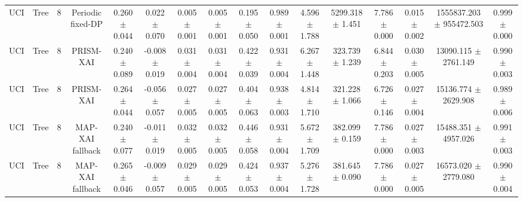 \begin{tabular}{lccccccccccccccc}
UCI & Tree & 8 & Periodic fixed-DP & 0.260 $\pm$ 0.044 & 0.022 $\pm$ 0.070 & 0.005 $\pm$ 0.001 & 0.005 $\pm$ 0.001 & 0.195 $\pm$ 0.050 & 0.989 $\pm$ 0.001 & 4.596 $\pm$ 1.788 & 5299.318 $\pm$ 1.451 & 7.786 $\pm$ 0.000 & 0.015 $\pm$ 0.002 & 1555837.203 $\pm$ 955472.503 & 0.999 $\pm$ 0.000 \\
UCI & Tree & 8 & PRISM-XAI & 0.240 $\pm$ 0.089 & -0.008 $\pm$ 0.019 & 0.031 $\pm$ 0.004 & 0.031 $\pm$ 0.004 & 0.422 $\pm$ 0.039 & 0.931 $\pm$ 0.004 & 6.267 $\pm$ 1.448 & 323.739 $\pm$ 1.239 & 6.844 $\pm$ 0.203 & 0.030 $\pm$ 0.005 & 13090.115 $\pm$ 2761.149 & 0.990 $\pm$ 0.003 \\
UCI & Tree & 8 & PRISM-XAI & 0.264 $\pm$ 0.044 & -0.056 $\pm$ 0.057 & 0.027 $\pm$ 0.005 & 0.027 $\pm$ 0.005 & 0.404 $\pm$ 0.063 & 0.938 $\pm$ 0.003 & 4.814 $\pm$ 1.710 & 321.228 $\pm$ 1.066 & 6.726 $\pm$ 0.146 & 0.027 $\pm$ 0.004 & 15136.774 $\pm$ 2629.908 & 0.989 $\pm$ 0.006 \\
UCI & Tree & 8 & MAP-XAI fallback & 0.240 $\pm$ 0.077 & -0.011 $\pm$ 0.019 & 0.032 $\pm$ 0.005 & 0.032 $\pm$ 0.005 & 0.446 $\pm$ 0.058 & 0.931 $\pm$ 0.004 & 5.672 $\pm$ 1.709 & 382.099 $\pm$ 0.159 & 7.786 $\pm$ 0.000 & 0.027 $\pm$ 0.003 & 15488.351 $\pm$ 4957.026 & 0.991 $\pm$ 0.003 \\
UCI & Tree & 8 & MAP-XAI fallback & 0.265 $\pm$ 0.046 & -0.009 $\pm$ 0.057 & 0.029 $\pm$ 0.005 & 0.029 $\pm$ 0.005 & 0.424 $\pm$ 0.053 & 0.937 $\pm$ 0.004 & 5.276 $\pm$ 1.728 & 381.645 $\pm$ 0.090 & 7.786 $\pm$ 0.000 & 0.027 $\pm$ 0.005 & 16573.020 $\pm$ 2779.080 & 0.990 $\pm$ 0.004 \\
\bottomrule
\end{tabular}
